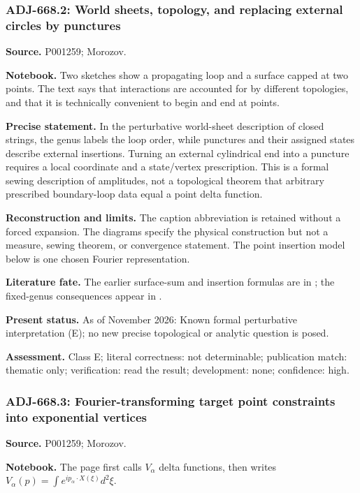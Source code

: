 \subsubsection{ADJ-668.2: World sheets, topology, and replacing external circles by punctures}
\noindent\textbf{Source.} P001259; Morozov.\par
\noindent\textbf{Notebook.} Two sketches show a propagating loop and a surface capped at two points. The text says that interactions are accounted for by different topologies, and that it is technically convenient to begin and end at points.\par

\noindent\textbf{Precise statement.} In the perturbative world-sheet description of closed strings, the genus labels the loop order, while punctures and their assigned states describe external insertions. Turning an external cylindrical end into a puncture requires a local coordinate and a state/vertex prescription. This is a formal sewing description of amplitudes, not a topological theorem that arbitrary prescribed boundary-loop data equal a point delta function.\par

\noindent\textbf{Reconstruction and limits.} The caption abbreviation is retained without a forced expansion. The diagrams specify the physical construction but not a measure, sewing theorem, or convergence statement. The point insertion model below is one chosen Fourier representation.\par

\noindent\textbf{Literature fate.} The earlier surface-sum and insertion formulas are in \citet[eqs.~(1)--(3),(26)--(31)]{polyakov1981quantum}; the fixed-genus consequences appear in \citet[\S6]{belavinknizhnik1986complex}.\par

\noindent\textbf{Present status.} As of November 2026: Known formal perturbative interpretation (E); no new precise topological or analytic question is posed.\par

\noindent\textbf{Assessment.} Class E; literal correctness: not determinable; publication match: thematic only; verification: read the result; development: none; confidence: high.\par

\subsubsection{ADJ-668.3: Fourier-transforming target point constraints into exponential vertices}
\noindent\textbf{Source.} P001259; Morozov.\par
\noindent\textbf{Notebook.} The page first calls \(V_\alpha\) delta functions, then writes \(V_\alpha(p)=\int e^{ip_\alpha\cdot X(\xi)}d^2\xi\).\par

